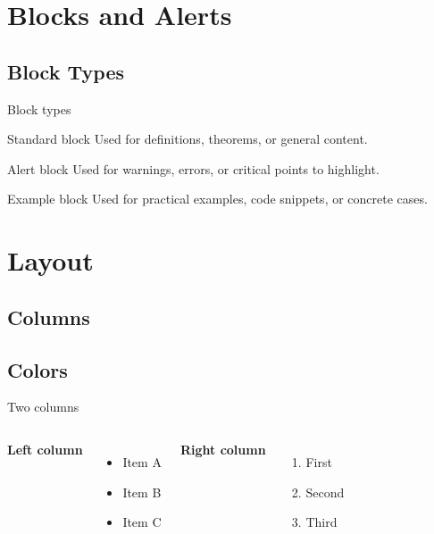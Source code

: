 \documentclass[aspectratio=169, 12pt]{beamer}
\begin{document}
\section{Blocks and Alerts}
\subsection{Block Types}

\begin{frame}{Block types}
	\begin{block}{Standard block}
		Used for definitions, theorems, or general content.
	\end{block}

	\medskip

	\begin{alertblock}{Alert block}
		Used for warnings, errors, or critical points to highlight.
	\end{alertblock}

	\medskip

	\begin{exampleblock}{Example block}
		Used for practical examples, code snippets, or concrete cases.
	\end{exampleblock}
\end{frame}

\section{Layout}
\subsection{Columns}
\subsection{Colors}

\begin{frame}{Two columns}
	\begin{columns}[t]
		\textbf{Left column}

		\begin{itemize}
			\item Item A
			\item Item B
			\item Item C
		\end{itemize}

		\textbf{Right column}

		\begin{enumerate}
			\item First
			\item Second
			\item Third
		\end{enumerate}
	\end{columns}
\end{frame}
\end{document}

